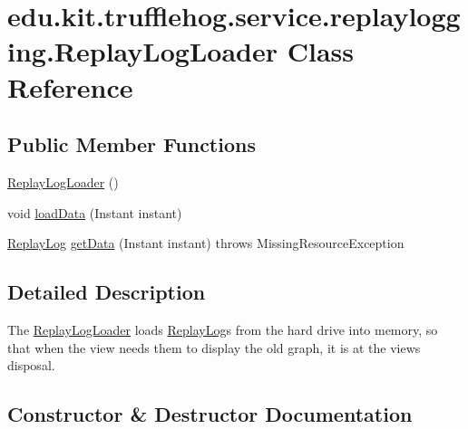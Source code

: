 \hypertarget{classedu_1_1kit_1_1trufflehog_1_1service_1_1replaylogging_1_1_replay_log_loader}{}\section{edu.\+kit.\+trufflehog.\+service.\+replaylogging.\+Replay\+Log\+Loader Class Reference}
\label{classedu_1_1kit_1_1trufflehog_1_1service_1_1replaylogging_1_1_replay_log_loader}
\subsection*{Public Member Functions}
\begin{DoxyCompactItemize}
\item 
\hyperlink{classedu_1_1kit_1_1trufflehog_1_1service_1_1replaylogging_1_1_replay_log_loader_a8e5f1797640ddd452660e9989b67cd7f}{Replay\+Log\+Loader} ()
\item 
void \hyperlink{classedu_1_1kit_1_1trufflehog_1_1service_1_1replaylogging_1_1_replay_log_loader_a9fdb8df0838a49a212bcae58e30bd833}{load\+Data} (Instant instant)
\item 
\hyperlink{classedu_1_1kit_1_1trufflehog_1_1service_1_1replaylogging_1_1_replay_log}{Replay\+Log} \hyperlink{classedu_1_1kit_1_1trufflehog_1_1service_1_1replaylogging_1_1_replay_log_loader_a8d65e900a6e19990f4df0397e806fbc4}{get\+Data} (Instant instant)  throws Missing\+Resource\+Exception 
\end{DoxyCompactItemize}


\subsection{Detailed Description}
The \hyperlink{classedu_1_1kit_1_1trufflehog_1_1service_1_1replaylogging_1_1_replay_log_loader}{Replay\+Log\+Loader} loads \hyperlink{classedu_1_1kit_1_1trufflehog_1_1service_1_1replaylogging_1_1_replay_log}{Replay\+Log}s from the hard drive into memory, so that when the view needs them to display the old graph, it is at the view\textquotesingle{}s disposal. 

\subsection{Constructor \& Destructor Documentation}
\hypertarget{classedu_1_1kit_1_1trufflehog_1_1service_1_1replaylogging_1_1_replay_log_loader_a8e5f1797640ddd452660e9989b67cd7f}{}
